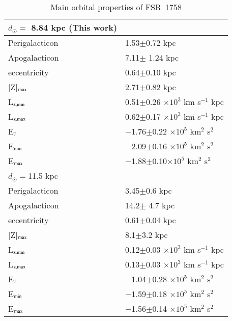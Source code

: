 \documentclass[longauth]{aa} %
\begin{document}
\begin{table}
	\begin{center}
		\setlength{\tabcolsep}{1.5mm}  
		\caption{Main orbital properties of FSR~1758}
		\begin{tabular}{ll}
			 \hline
             \hline
              $d_{\odot} = $ 8.84 kpc (This work) & \\
             \hline
             \hline
			Perigalacticon          &  1.53$\pm$0.72 kpc \\			
			Apogalacticon           &  7.11$\pm$ 1.24 kpc \\
			eccentricity               &  0.64$\pm$0.10 kpc \\
			|Z|$_{\rm max}$   & 2.71$\pm$0.82 kpc \\
			
			L$_{\rm z, min}$   &  0.51$\pm$0.26 $\times{}10^3 $  km s$^{-1}$  kpc \\
			L$_{\rm z, max}$  &  0.62$\pm$0.17 $\times{}10^3 $  km s$^{-1}$  kpc \\
			E$_{\rm J}$             &  $-$1.76$\pm$0.22 $\times{}10^5 $  km$^{2}$ s$^{2}$\\
			E$_{\rm min}$        & $-$2.09$\pm$0.16 $\times{}10^5 $  km$^{2}$ s$^{2}$ \\
			E$_{\rm max}$       &  $-$1.88$\pm$0.10$\times{}10^5 $  km$^{2}$ s$^{2}$ \\
			 \hline
			 \hline
$d_{\odot} = $11.5 kpc \citep{Barba2019}& \\
\hline
\hline
Perigalacticon          &  3.45$\pm$0.6 kpc \\
Apogalacticon           &  14.2$\pm$ 4.7 kpc \\
eccentricity               &  0.61$\pm$0.04 kpc \\
|Z|$_{\rm max}$   & 8.1$\pm$3.2 kpc \\
L$_{\rm z, min}$   &  0.12$\pm$0.03 $\times{}10^3 $  km s$^{-1}$  kpc \\
L$_{\rm z, max}$  &  0.13$\pm$0.03 $\times{}10^3 $  km s$^{-1}$  kpc \\
E$_{\rm J}$             &  $-$1.04$\pm$0.28 $\times{}10^5 $  km$^{2}$ s$^{2}$\\
E$_{\rm min}$        & $-$1.59$\pm$0.18 $\times{}10^5 $  km$^{2}$ s$^{2}$ \\
E$_{\rm max}$       &  $-$1.56$\pm$0.14 $\times{}10^5 $  km$^{2}$ s$^{2}$ \\
\hline 			 
		\end{tabular}  \label{Table2}
	\end{center}
\end{table}   
\end{document}
